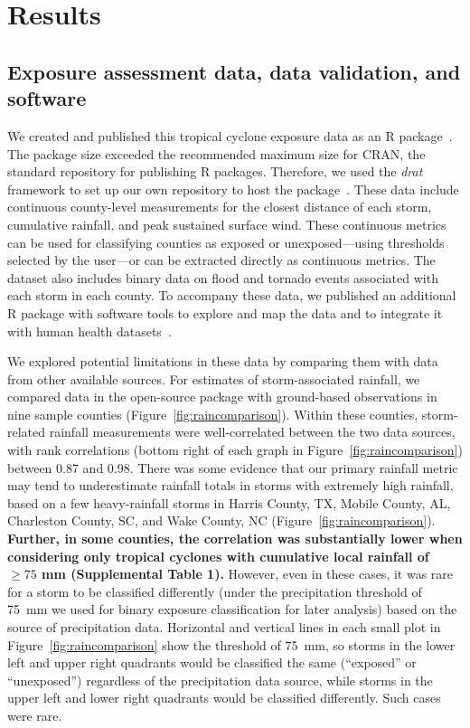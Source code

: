 \section*{Results}

\subsection*{Exposure assessment data, data validation, and software}

We created and published this tropical cyclone exposure data as an R
package~\parencite{hurricaneexposuredata}.  The package size exceeded the
recommended maximum size for \ac{CRAN}, the standard repository for publishing
R packages. Therefore, we used the \textit{drat} framework to set up our own
repository to host the package~\parencite{anderson2017hosting}. These data
include continuous county-level measurements for the closest distance of each
storm, cumulative rainfall, and peak sustained surface wind. These continuous
metrics can be used for classifying counties as exposed or unexposed---using
thresholds selected by the user---or can be extracted directly as continuous
metrics. The dataset also includes binary data on flood and tornado events
associated with each storm in each county. To accompany these data, we
published an additional R package with software tools to explore and map the
data and to integrate it with human health
datasets~\parencite{hurricaneexposure}.

We explored potential limitations in these data by comparing them with data
from other available sources.  For estimates of storm-associated rainfall, we
compared data in the open-source package with ground-based observations in nine
sample counties (Figure~\ref{fig:raincomparison}). Within these counties,
storm-related rainfall measurements were well-correlated between the two data
sources, with rank correlations (bottom right of each graph in
Figure~\ref{fig:raincomparison}) between 0.87 and 0.98.  There was some
evidence that our primary rainfall metric may tend to underestimate rainfall
totals in storms with extremely high rainfall, based on a few heavy-rainfall
storms in Harris County, TX, Mobile County, AL, Charleston County, SC, and Wake
County, NC (Figure~\ref{fig:raincomparison}). \textbf{Further, in some
counties, the correlation was substantially lower when considering only
tropical cyclones with cumulative local rainfall of $\ge75$ mm (Supplemental
Table 1).} However, even in these cases, it was rare for a storm to be
classified differently (under the precipitation threshold of
75~\si{\milli\metre} we used for binary exposure classification for later
analysis) based on the source of precipitation data. Horizontal and vertical
lines in each small plot in Figure~\ref{fig:raincomparison} show the threshold
of 75~\si{\milli\metre}, so storms in the lower left and upper right quadrants
would be classified the same (``exposed'' or ``unexposed'') regardless of the
precipitation data source, while storms in the upper left and lower right
quadrants would be classified differently. Such cases were rare.

